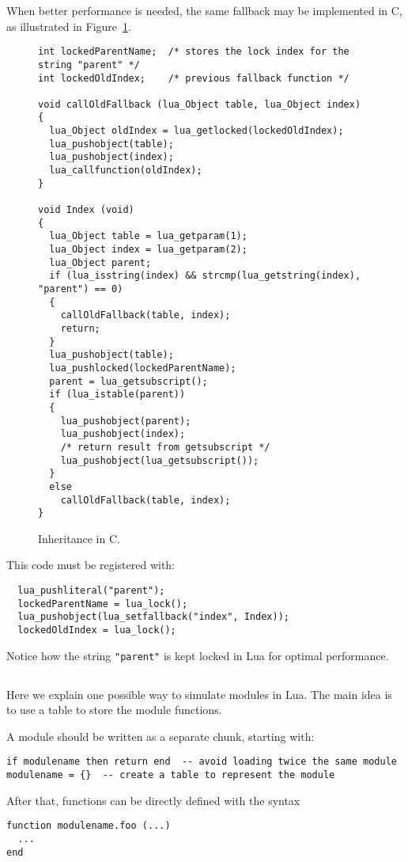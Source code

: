 When better performance is needed,
the same fallback may be implemented in C,
as illustrated in Figure~\ref{Cinher}.
\begin{figure}
\Line
\begin{verbatim}
int lockedParentName;  /* stores the lock index for the string "parent" */
int lockedOldIndex;    /* previous fallback function */

void callOldFallback (lua_Object table, lua_Object index)
{
  lua_Object oldIndex = lua_getlocked(lockedOldIndex);
  lua_pushobject(table);
  lua_pushobject(index);
  lua_callfunction(oldIndex);
}

void Index (void)
{
  lua_Object table = lua_getparam(1);
  lua_Object index = lua_getparam(2);
  lua_Object parent;
  if (lua_isstring(index) && strcmp(lua_getstring(index), "parent") == 0)
  {
    callOldFallback(table, index);
    return;
  }
  lua_pushobject(table);
  lua_pushlocked(lockedParentName);
  parent = lua_getsubscript();
  if (lua_istable(parent))
  {
    lua_pushobject(parent);
    lua_pushobject(index);
    /* return result from getsubscript */
    lua_pushobject(lua_getsubscript());
  }
  else
    callOldFallback(table, index);
}
\end{verbatim}
\caption{Inheritance in C.\label{Cinher}}
\Line
\end{figure}
This code must be registered with:
\begin{verbatim}
  lua_pushliteral("parent");
  lockedParentName = lua_lock();
  lua_pushobject(lua_setfallback("index", Index));
  lockedOldIndex = lua_lock();
\end{verbatim}
Notice how the string \verb'"parent"' is kept
locked in Lua for optimal performance.

\subsection{}
Here we explain one possible way to simulate modules in Lua.
The main idea is to use a table to store the module functions.

A module should be written as a separate chunk, starting with:
\begin{verbatim}
if modulename then return end  -- avoid loading twice the same module
modulename = {}  -- create a table to represent the module
\end{verbatim}
After that, functions can be directly defined with the syntax
\begin{verbatim}
function modulename.foo (...)
  ...
end
\end{verbatim}


